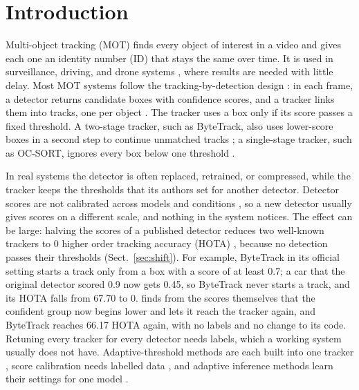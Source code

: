 \section{Introduction}\label{sec:intro}

Multi-object tracking (MOT) finds every object of interest in a video and gives each one an
identity number (ID) that stays the same over time. It is used in surveillance, driving, and drone
systems \cite{zhu2022visdrone}, where results are needed with little delay. Most
MOT systems follow the tracking-by-detection design \cite{adzemovic2026survey}: in each frame, a
detector returns candidate boxes with confidence scores, and a tracker links them into tracks, one
per object \cite{bewley2016sort,zhang2022bytetrack,cao2023ocsort}. The tracker uses a box only if
its score passes a fixed threshold. A two-stage tracker, such as ByteTrack, also uses lower-score
boxes in a second step to continue unmatched tracks \cite{zhang2022bytetrack}; a single-stage
tracker, such as OC-SORT, ignores every box below one threshold \cite{cao2023ocsort}.

In real systems the detector is often replaced, retrained, or compressed, while the tracker keeps
the thresholds that its authors set for another detector. Detector scores are not calibrated across
models and conditions \cite{kuppers2020detcalib}, so a new detector usually gives scores on a
different scale, and nothing in the system notices. The effect can be large: halving the scores of
a published detector reduces two well-known trackers to 0 higher order tracking accuracy (HOTA)
\cite{luiten2021hota}, because no detection passes their thresholds (Sect.~\ref{sec:shift}). For example, ByteTrack in
its official setting starts a track only from a box with a score of at least 0.7; a car that the
original detector scored 0.9 now gets 0.45, so ByteTrack never starts a track, and its HOTA falls
from 67.70 to 0. \scl{} finds from the scores themselves that the confident group now begins
lower and lets it reach the tracker again, and ByteTrack reaches 66.17 HOTA again, with no labels and no change to its code.
Retuning every tracker for every detector needs labels, which a working system usually does not
have. Adaptive-threshold methods are each built into one tracker
\cite{ma2023adaptivebytetrack,shim2024adaptrack,act2026adaptive}, score calibration needs
labelled data \cite{kuppers2020detcalib}, and adaptive inference methods learn their settings for
one model \cite{han2022dynamic}.

